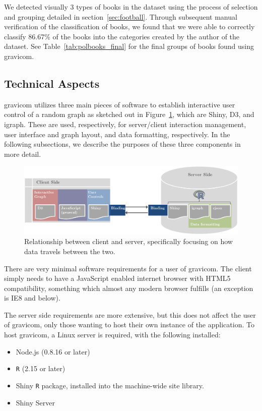 \documentclass{article}\usepackage[]{graphicx}\usepackage[]{color}
\begin{document}
We detected visually 3 types of books in the dataset using the process of selection and grouping detailed in section~\ref{sec:football}. Through subsequent manual verification of the classification of books, we found that we were able to correctly classify 86.67\% of the books into the categories created by the author of the dataset. See Table~\ref{tab:polbooks_final} for the final groups of books found using gravicom.


\subsection{Technical Aspects}

gravicom utilizes three main pieces of software to establish interactive user control of a random graph as sketched out in Figure~\ref{fig:clientserver}, which are Shiny, D3, and igraph. These are used, respectively, for server/client interaction management, user interface and graph layout, and data formatting, respectively. In the following subsections, we describe the purposes of these three components in more detail.

\begin{figure}[H]
\centering
\includegraphics[width=\textwidth]{images/clientserverflow.png}
\caption{\label{fig:clientserver} Relationship between client and server, specifically focusing on how data travels between the two.}
\end{figure}

There are very minimal software requirements for a user of gravicom. The client simply needs to have a JavaScript enabled internet browser with HTML5 compatibility, something which almost any modern browser fulfills (an exception is IE8 and below). 

The server side requirements are more extensive, but this does not affect the user of gravicom, only those wanting to host their own instance of the application. To host gravicom, a Linux server is required, with the following installed:

\begin{itemize}
\item Node.js (0.8.16 or later)
\item {\tt R} (2.15 or later)
\item Shiny {\tt R} package, installed into the machine-wide site library. 
\item Shiny Server
\end{itemize}
\end{document}
